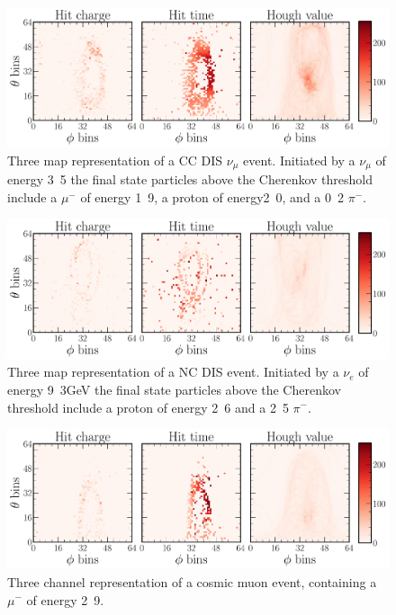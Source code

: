 \begin{figure} %
    \includegraphics[width=\textwidth]{diagrams/7-results/explore_numu_ccdis_event.pdf}
    \caption[Example of a CC DIS $\nu_{\mu}$ event]
    {Three map representation of a CC DIS $\nu_{\mu}$ event. Initiated by a $\nu_{\mu}$ of
        energy \unit{3.5}{\GeV} the final state particles above the Cherenkov threshold include a
        $\mu^{-}$ of energy \unit{1.9}{\GeV}, a proton of energy\unit{2.0}{\GeV}, and a
        \unit{0.2}{\GeV} $\pi^{-}$.}
    \label{fig:explore_numu_ccdis_event}
\end{figure}

\begin{figure} %
    \includegraphics[width=\textwidth]{diagrams/7-results/explore_nuel_ncdis_event.pdf}
    \caption[Example of a NC DIS event]
    {Three map representation of a NC DIS event. Initiated by a $\nu_{e}$ of energy
        \unit{9.3}{GeV} the final state particles above the Cherenkov threshold include a proton
        of energy \unit{2.6}{\GeV} and a \unit{2.5}{\GeV} $\pi^{-}$.}
    \label{fig:explore_nuel_ncdis_event}
\end{figure}

\begin{figure} %
    \includegraphics[width=\textwidth]{diagrams/7-results/explore_cosmic_event.pdf}
    \caption[Example of a cosmic muon event]
    {Three channel representation of a cosmic muon event, containing a $\mu^{-}$ of energy
        \unit{2.9}{\GeV}.}
    \label{fig:explore_cosmic_event}
\end{figure}

